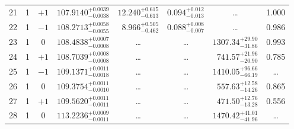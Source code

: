\begin{table*}[!]
\begin{tabular}{llcrrlrc}
21 & 1 & $+1$ & $    107.9140_{-      0.0038}^{+      0.0039}$ & $      12.240_{-       0.613}^{+       0.615}$ & $       0.094_{-       0.013}^{+       0.012}$ & \multicolumn{1}{c}{\dots} & 1.000\\[1pt]
22 & 1 & $-1$ & $    108.2713_{-      0.0055}^{+      0.0058}$ & $       8.966_{-       0.462}^{+       0.505}$ & $       0.088_{-       0.007}^{+       0.008}$ & \multicolumn{1}{c}{\dots} & 0.986\\[1pt]
23 & 1 & 0 & $    108.4838_{-      0.0008}^{+      0.0007}$ & \multicolumn{1}{c}{\dots} & \multicolumn{1}{c}{\dots} & $     1307.34_{-       31.86}^{+       29.90}$ & 0.993 \\[1pt]
24 & 1 & $+1$ & $    108.7039_{-      0.0008}^{+      0.0008}$ & \multicolumn{1}{c}{\dots} & \multicolumn{1}{c}{\dots} & $      741.57_{-       20.90}^{+       21.96}$ & 0.785\\[1pt]
25 & 1 & $-1$ & $    109.1371_{-      0.0018}^{+      0.0011}$ & \multicolumn{1}{c}{\dots} & \multicolumn{1}{c}{\dots} & $     1410.05_{-       66.19}^{+       96.66}$ & \dots \\[1pt]
26 & 1 & 0 & $    109.3754_{-      0.0010}^{+      0.0011}$ & \multicolumn{1}{c}{\dots} & \multicolumn{1}{c}{\dots} & $      557.63_{-       14.26}^{+       12.58}$ & 0.865\\[1pt]
27 & 1 & $+1$ & $    109.5620_{-      0.0011}^{+      0.0011}$ & \multicolumn{1}{c}{\dots} & \multicolumn{1}{c}{\dots} & $      471.50_{-       13.28}^{+       12.76}$ & 0.556\\[1pt]
28 & 1 & 0 & $    113.2236_{-      0.0011}^{+      0.0009}$ & \multicolumn{1}{c}{\dots} & \multicolumn{1}{c}{\dots} & $     1470.42_{-       41.96}^{+       41.01}$ & \dots \\[1pt]


\end{tabular}
\end{table*}
